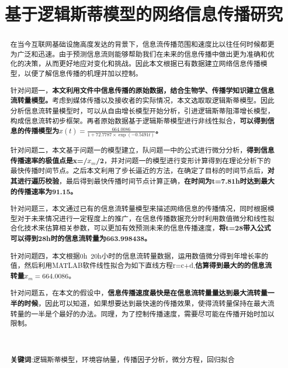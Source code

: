 \documentclass[UTF8]{ctexart}
\title{\textbf{基于逻辑斯蒂模型的网络信息传播研究}}%
\date{}%
\author{}%
\begin{document}
\setcounter{page}{1}%
\maketitle
\vspace{-0.95cm}
\thispagestyle{fancy}   
\fancyhf{} %
\renewcommand{\headrulewidth}{0pt} %
	\renewcommand{\abstractname}{\sihao 摘\quad 要} %
\begin{abstract}\xiaosihao
	\vspace{0.1cm}
	\begin{spacing}{1.4}\xiaosihao
	在当今互联网基础设施高度发达的背景下，信息流传播范围和速度比以往任何时候都更为广泛和迅速。由于预测信息流则能够帮助我们在未来的信息传播中做出更为准确和优化的决策，从而更好地应对变化和挑战。因此本文根据已有数据建立网络信息传播模型，以便了解信息传播的机理并加以控制。\par
	针对问题一，\textbf{本文利用文件中信息传播的原始数据，结合生物学、传播学知识建立信息流转量模型。}考虑到媒体传播以及接收者的实际情况，本文选取取逻辑斯蒂模型。因此分析信息流转量模型时，可以从自由增长模型开始分析，引进逻辑斯蒂阻滞增长模型，构成信息流转初步框架。再者原始数据基于逻辑斯蒂模型进行非线性拟合，\textbf{可以得到信息的传播模型为$x\left( t \right) =\frac{664.0086}{1+72.7787\times \exp \left( -0.5491t \right)}$。}\par
	针对问题二，本文基于问题一的模型建立，队问题一中的公式进行微分分析，\textbf{得到信息传播速率的极值点是x=/$x_m$/2}，并对问题一的模型进行变形计算得到在理论分析下的最快传播时间节点。之后本文利用了步长逼近的方法，在确定了目标的时间节点后，\textbf{对其进行遍历校验}，最后得到最快传播时间节点计算正确，\textbf{在时间为t=7.81h时达到最大的传播速率为91.15。}\par
	针对问题三，本文通过已有的信息流转量模型来描述网络信息的传播情况，同时根据模型对于未来情况进行一定程度上的推广，在信息传播数据充分时利用数值微分和线性拟合化技术来估算相关参数，可以更加有效预测未来的信息传播速度，\textbf{将t=28带入公式可以得到28h时的信息流转量为663.998438。}\par
	针对问题四，本文根据0h~20h小时的信息流转量数据，运用数值微分得到年增长率的值，然后利用MATLAB软件线性拟合为如下直线方程r=c+d,\textbf{估算得到最大的的信息流转量$x_m=664.0086$}。\par
	针对问题五，在本文的假设中，\textbf{信息传播速度最快是在信息流转量量达到最大流转量一半的时候}，因此可以知道，如果想要达到最快速的传播效果，使得流转量保持在最大流转量的一半是个最好的办法。同理，为了控制传播速度，需要尽可能在传播开始时加以限制。\par
	\end{spacing}
	\\ \hspace*{\fill} \\
	\textbf{关键词}:\quad 逻辑斯蒂模型，环境容纳量，传播因子分析，微分方程，回归拟合
\end{abstract}
\end{document}
